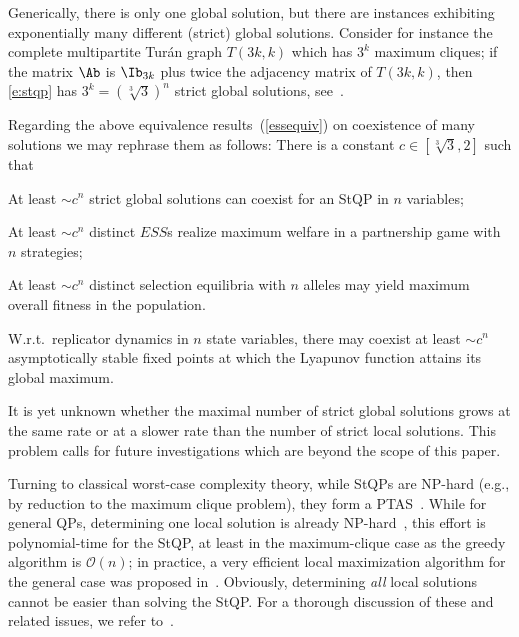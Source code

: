 \documentclass[moor]{informs3}              %
\def\reff#1{(\ref{#1})}
\begin{document}
Generically, there is only one global solution, but there are instances exhibiting exponentially many different (strict) global solutions. Consider for instance the
complete multipartite Tur\'an graph $T(3k,k)$ which has $3^k$ maximum cliques; if the matrix $\Ab$ is $\Ib_{3k}$ plus twice the adjacency matrix of $T(3k,k)$, then \eqref{e:stqp} has $3^k=(\sqrt[3]{3})^n$ strict global solutions, see~\cite{Bomz98}.

Regarding the above equivalence results~\reff{essequiv} on coexistence of many solutions we may rephrase them as follows: There is a constant $c\in[\sqrt[3]{3},2]$ such that

At least $\sim  c^n$ strict global solutions can coexist for an StQP in $n$ variables;

At least $\sim  c^n$ distinct $ESS$s realize maximum welfare in a partnership game with $n$ strategies;

At least $\sim  c^n$ distinct selection equilibria with $n$ alleles may yield maximum overall fitness in the population.

W.r.t.~replicator dynamics in $n$ state variables, there may coexist at least $\sim  c^n$ asymptotically stable fixed points at which the Lyapunov function attains its global maximum.

It is yet unknown whether the maximal number of strict global solutions grows at the same rate or at a slower rate than the number of strict local solutions. This problem calls
for future investigations which are beyond the scope of this paper.

Turning to classical worst-case complexity theory, while StQPs are NP-hard (e.g., by reduction to the maximum clique problem), they form a PTAS~\cite{Bomz02c}. While for general QPs, determining one local solution is already NP-hard~\cite{Pard91}, this effort is polynomial-time for the StQP, at least in the maximum-clique case as the greedy algorithm is
${\mathcal O} (n)$; in practice, a very efficient local maximization algorithm for the general case was proposed in~\cite{Rota11a}. Obviously, determining {\em all} local solutions cannot be easier than solving the StQP. For a thorough discussion of these and related issues, we refer to~\cite{deKl08}.
\end{document}
